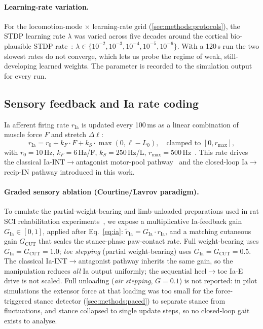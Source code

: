 \paragraph{Learning-rate variation.}
For the locomotion-mode $\times$ learning-rate grid
(\autoref{sec:methods:protocols}), the STDP learning rate $\lambda$ was
varied across five decades around the cortical bio-plausible STDP
rate~\cite{biPoo1998,morrison2007}:
$\lambda \in \{10^{-2},10^{-3},10^{-4},10^{-5},10^{-6}\}$. With a
120\,s run the two slowest rates do not converge, which lets us probe the
regime of weak, still-developing learned weights. The parameter is
recorded to the simulation output for every run.

\subsection{Sensory feedback and Ia rate coding}\label{sec:methods:ia}
Ia afferent firing rate $r_{\text{Ia}}$ is updated every 100\,ms as a
linear combination of muscle force $F$ and stretch $\Delta\ell$:
\begin{equation}
  r_{\text{Ia}} = r_0 + k_F \cdot F + k_S \cdot \max(0, \ell - L_0),
  \quad \text{clamped to } [0, r_{\max}],
  \label{eq:ia}
\end{equation}
with $r_0=10$\,Hz, $k_F=6$\,Hz/F, $k_S=250$\,Hz/L,
$r_{\max}=500$\,Hz~\cite{loeb1981,prochazka1999}. This rate drives the
classical Ia-INT$\to$antagonist motor-pool
pathway~\cite{jankowska1992} and the closed-loop Ia$\to$recip-IN pathway
introduced in this work.

\paragraph{Graded sensory ablation (Courtine/Lavrov paradigm).}
To emulate the partial-weight-bearing and limb-unloaded preparations
used in rat SCI rehabilitation
experiments~\cite{lavrov2008,courtine2009,edgerton2008}, we expose a
multiplicative Ia-feedback gain $G_{\text{Ia}} \in [0, 1]$, applied
after Eq.~\ref{eq:ia}:
$\tilde{r}_{\text{Ia}} = G_{\text{Ia}}\cdot r_{\text{Ia}}$, and a matching
cutaneous gain $G_{\text{CUT}}$ that scales the stance-phase paw-contact
rate. Full weight-bearing uses $G_{\text{Ia}}=G_{\text{CUT}}=1.0$;
\emph{toe stepping} (partial weight-bearing) uses
$G_{\text{Ia}}=G_{\text{CUT}}=0.5$. The classical Ia-INT$\to$antagonist
pathway inherits the same gain, so the manipulation reduces \emph{all} Ia
output uniformly; the sequential heel$\to$toe Ia-E drive is not scaled.
Full unloading (\emph{air stepping}, $G=0.1$) is not reported: in pilot
simulations the extensor force at that loading was too small for the
force-triggered stance detector (\autoref{sec:methods:paced}) to separate
stance from fluctuations, and stance collapsed to single update steps, so
no closed-loop gait exists to analyse.

